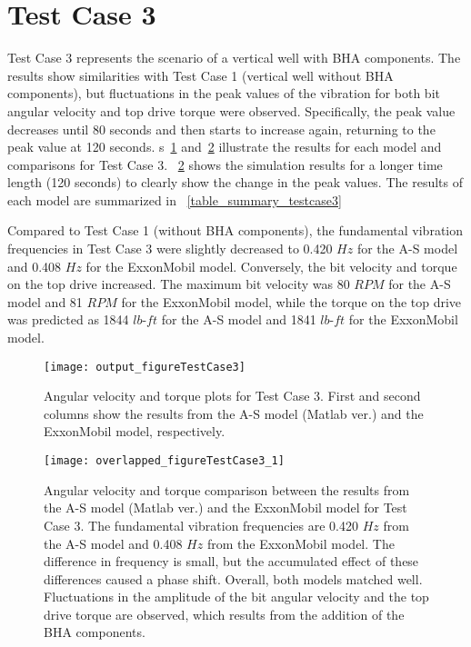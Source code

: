 \section{Test Case 3}
 Test Case 3 represents the scenario of a vertical well with BHA components. The results show similarities with Test Case 1 (vertical well without BHA components), but fluctuations in the peak values of the vibration for both bit angular velocity and top drive torque were observed. Specifically, the peak value decreases until 80 seconds and then starts to increase again, returning to the peak value at 120 seconds. \figurename{}s~\ref{figure_testcase3} and~\ref{figure_testcase3_overlapped} illustrate the results for each model and comparisons for Test Case 3. \figurename~\ref{figure_testcase3_overlapped} shows the simulation results for a longer time length (120 seconds) to clearly show the change in the peak values. The results of each model are summarized in \tablename~\ref{table_summary_testcase3}

Compared to Test Case 1 (without BHA components), the fundamental vibration frequencies in Test Case 3 were slightly decreased to 0.420 $Hz$ for the A-S model and 0.408 $Hz$ for the ExxonMobil model. Conversely, the bit velocity and torque on the top drive increased. The maximum bit velocity was 80 $RPM$ for the A-S model and 81 $RPM$ for the ExxonMobil model, while the torque on the top drive was predicted as 1844 $lb\mbox{-}ft$ for the A-S model and 1841 $lb\mbox{-}ft$ for the ExxonMobil model.

\begin{figure}
	\centering
	\texttt{[image: output\_figureTestCase3]}
    \caption[Angular velocity and torque plots for Test Case 3]{Angular velocity and torque plots for Test Case 3. First and second columns show the results from the A-S model (Matlab ver.) and the ExxonMobil model, respectively.}
	\label{figure_testcase3}
\end{figure}
\begin{figure}
	\centering
	\texttt{[image: overlapped\_figureTestCase3\_1]}
    \caption[Angular velocity and torque comparison plots for Test Case 3]{Angular velocity and torque comparison between the results from the A-S model (Matlab ver.) and the ExxonMobil model for Test Case 3. The fundamental vibration frequencies are 0.420 $Hz$ from the A-S model and 0.408 $Hz$ from the ExxonMobil model. The difference in frequency is small, but the accumulated effect of these differences caused a phase shift. Overall, both models matched well. Fluctuations in the amplitude of the bit angular velocity and the top drive torque are observed, which results from the addition of the BHA components.}
    \label{figure_testcase3_overlapped}
\end{figure}

